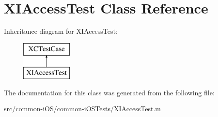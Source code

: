 \hypertarget{interface_x_i_access_test}{}\section{X\+I\+Access\+Test Class Reference}
\label{interface_x_i_access_test}
Inheritance diagram for X\+I\+Access\+Test\+:\begin{figure}[H]
\begin{center}
\leavevmode
\includegraphics[height=2.000000cm]{interface_x_i_access_test}
\end{center}
\end{figure}


The documentation for this class was generated from the following file\+:\begin{DoxyCompactItemize}
\item 
src/common-\/i\+O\+S/common-\/i\+O\+S\+Tests/X\+I\+Access\+Test.\+m\end{DoxyCompactItemize}
